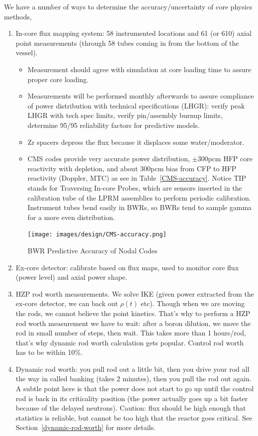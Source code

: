 \documentclass{school-22.211-notes}
\begin{document}
\clearpage
{}
We have a number of ways to determine the accuracy/uncertainty of core physics methods,
\begin{enumerate}
\item In-core flux mapping system: 58 instrumented locations and 61 (or 610) axial point measurements (through 58 tubes coming in from the bottom of the vessel). 
  \begin{itemize}
    \item Measurement should agree with simulation at core loading time to assure proper core loading. 
    \item Measurements will be performed monthly afterwards to assure compliance of power distribution with technical specifications (LHGR): verify peak LHGR with tech spec limits, verify pin/assembly burnup limits, determine 95/95 reliability factors for predictive models. 
    \item Zr spacers depress the flux because it displaces some water/moderator. 
    \item CMS codes provide very accurate power distribution, $\pm 300$pcm HFP core reactivity with depletion, and about 300pcm bias from CFP to HFP reactivity (Doppler, MTC) as see in Table~\ref{CMS-accuracy}. Notice TIP stands for Traversing In-core Probes, which are sensors inserted in the calibration tube of the LPRM assemblies to perform periodic calibration. Instrument tubes bend easily in BWRs, so BWRs tend to sample gamma for a more even distribution. 
      \begin{table}[ht]
        \centering
        \texttt{[image: images/design/CMS-accuracy.png]}
        \caption{BWR Predictive Accuracy of Nodal Codes} \label{CMS-accuracy}
      \end{table}
  \end{itemize}

\item Ex-core detector: calibrate based on flux maps, used to monitor core flux (power level) and axial power shape. 

\item HZP rod worth measurements. We solve IKE (given power extracted from the ex-core detector, we can back out $\rho (t)$ etc). Though when we are moving the rods, we cannot believe the point kinetics. That's why to perform a HZP rod worth measurement we have to wait: after a boron dilution, we move the rod in small number of steps, then wait. This takes more than 1 hours/rod, that's why dynamic rod worth calculation gets popular. Control rod worth has to be within 10\%.

\item Dynamic rod worth:  you pull rod out a little bit, then you drive your rod all the way in called banking (takes 2 minutes), then you pull the rod out again.  A subtle point here is that the power does not start to go up until the control rod is back in its criticality position (the power actually goes up a bit faster because of the delayed neutrons). Caution: flux should be high enough that statistics is reliable, but cannot be too high that the reactor goes critical.  See Section~\ref{dynamic-rod-worth} for more details. 
\end{enumerate}
\end{document}
